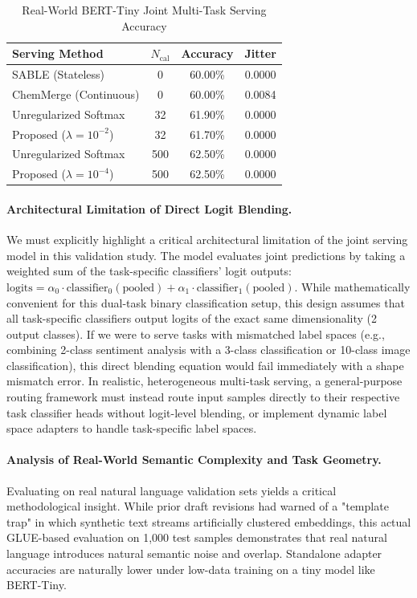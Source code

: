 \begin{table}[ht]
\caption{Real-World BERT-Tiny Joint Multi-Task Serving Accuracy}
\label{tab:real_world_results}
\centering
\begin{footnotesize}
\setlength{\tabcolsep}{3.0pt}
\begin{tabular}{lccc}
\toprule
\textbf{Serving Method} & \textbf{$N_{\text{cal}}$} & \textbf{Accuracy} & \textbf{Jitter} \\
\midrule
SABLE (Stateless) & 0 & 60.00\% & 0.0000 \\
ChemMerge (Continuous) & 0 & 60.00\% & 0.0084 \\
\midrule
Unregularized Softmax & 32 & 61.90\% & 0.0000 \\
Proposed ($\lambda=10^{-2}$) & 32 & 61.70\% & 0.0000 \\
Unregularized Softmax & 500 & 62.50\% & 0.0000 \\
Proposed ($\lambda=10^{-4}$) & 500 & 62.50\% & 0.0000 \\
\bottomrule
\end{tabular}
\end{footnotesize}
\end{table}

\paragraph{Architectural Limitation of Direct Logit Blending.}
We must explicitly highlight a critical architectural limitation of the joint serving model in this validation study. The model evaluates joint predictions by taking a weighted sum of the task-specific classifiers' logit outputs: $\text{logits} = \alpha_0 \cdot \text{classifier}_0(\text{pooled}) + \alpha_1 \cdot \text{classifier}_1(\text{pooled})$. While mathematically convenient for this dual-task binary classification setup, this design assumes that all task-specific classifiers output logits of the exact same dimensionality (2 output classes). If we were to serve tasks with mismatched label spaces (e.g., combining 2-class sentiment analysis with a 3-class classification or 10-class image classification), this direct blending equation would fail immediately with a shape mismatch error. In realistic, heterogeneous multi-task serving, a general-purpose routing framework must instead route input samples directly to their respective task classifier heads without logit-level blending, or implement dynamic label space adapters to handle task-specific label spaces.

\paragraph{Analysis of Real-World Semantic Complexity and Task Geometry.}
Evaluating on real natural language validation sets yields a critical methodological insight. While prior draft revisions had warned of a "template trap" in which synthetic text streams artificially clustered embeddings, this actual GLUE-based evaluation on 1,000 test samples demonstrates that real natural language introduces natural semantic noise and overlap. Standalone adapter accuracies are naturally lower under low-data training on a tiny model like BERT-Tiny.

